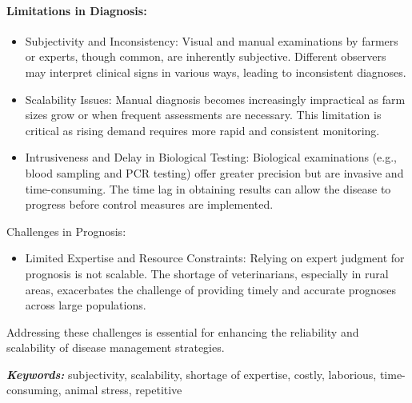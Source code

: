 \paragraph{Limitations in Diagnosis:} 
\begin{itemize}
    \item Subjectivity and Inconsistency: Visual and manual examinations by farmers or experts, though common, are inherently subjective. Different observers may interpret clinical signs in various ways, leading to inconsistent diagnoses.
    \item Scalability Issues: Manual diagnosis becomes increasingly impractical as farm sizes grow or when frequent assessments are necessary. This limitation is critical as rising demand requires more rapid and consistent monitoring.
    \item Intrusiveness and Delay in Biological Testing: Biological examinations (e.g., blood sampling and PCR testing) offer greater precision but are invasive and time-consuming. The time lag in obtaining results can allow the disease to progress before control measures are implemented.
\end{itemize}

Challenges in Prognosis:
\begin{itemize}
    \item Limited Expertise and Resource Constraints: Relying on expert judgment for prognosis is not scalable. The shortage of veterinarians, especially in rural areas, exacerbates the challenge of providing timely and accurate prognoses across large populations.
\end{itemize}

Addressing these challenges is essential for enhancing the reliability and scalability of disease management strategies. 

\textit{\textbf{Keywords:}} subjectivity, scalability, shortage of expertise, costly, laborious, time-consuming, animal stress, repetitive


